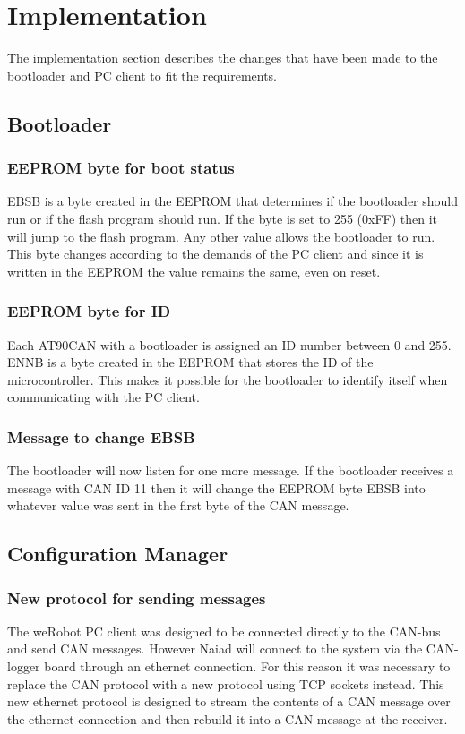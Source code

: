 \section{Implementation}\label{sec:implementation}
The implementation section describes the changes that have been made to the bootloader and PC client to fit the requirements.




\subsection{Bootloader}
\subsubsection{EEPROM byte for boot status}
EBSB is a byte created in the EEPROM that determines if the bootloader should run or if the flash program should run. If the byte is set to 255 (0xFF) then it will jump to the flash program. Any other value allows the bootloader to run. This byte changes according to the demands of the PC client and since it is written in the EEPROM the value remains the same, even on reset.

\subsubsection{EEPROM byte for ID}
Each AT90CAN with a bootloader is assigned an ID number between 0 and 255. ENNB is a byte created in the EEPROM that stores the ID of the microcontroller. This makes it possible for the bootloader to identify itself when communicating with the PC client.

\subsubsection{Message to change EBSB}
The bootloader will now listen for one more message. If the bootloader receives a message with CAN ID 11 then it will change the EEPROM byte EBSB into whatever value was sent in the first byte of the CAN message.

\subsection{Configuration Manager}

\subsubsection{New protocol for sending messages}
The weRobot PC client was designed to be connected directly to the CAN-bus and send CAN messages. However Naiad will connect to the system via the CAN-logger board through an ethernet connection. For this reason it was necessary to replace the CAN protocol with a new protocol using TCP sockets instead. This new ethernet protocol is designed to stream the contents of a CAN message over the ethernet connection and then rebuild it into a CAN message at the receiver. 

